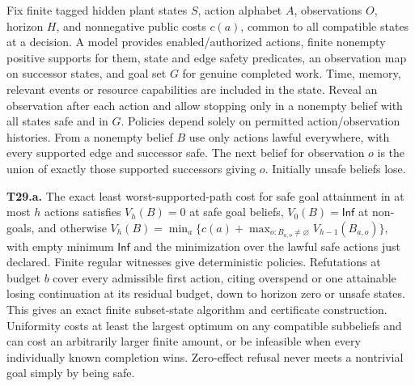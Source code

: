 \begin{theorem}\label{thm:t29}

Fix finite tagged hidden plant states \(S\), action alphabet \(A\), observations \(O\), horizon \(H\), and nonnegative public costs \(c(a)\), common to all compatible states at a decision. A model provides enabled/authorized actions, finite nonempty positive supports for them, state and edge safety predicates, an observation map on successor states, and goal set \(G\) for genuine completed work. Time, memory, relevant events or resource capabilities are included in the state. Reveal an observation after each action and allow stopping only in a nonempty belief with all states safe and in \(G\). Policies depend solely on permitted action/observation histories. From a nonempty belief \(B\) use only actions lawful everywhere, with every supported edge and successor safe. The next belief for observation \(o\) is the union of exactly those supported successors giving \(o\). Initially unsafe beliefs lose.

\label{thm:t29a}

\textbf{T29.a.} The exact least worst-supported-path cost for safe goal attainment in at most \(h\) actions satisfies \(V_h(B)=0\) at safe goal beliefs, \(V_0(B)=\mathsf{Inf}\) at non-goals, and otherwise
\(V_h(B)=\min_a\{c(a)+\max_{o:B_{a,o}\ne\varnothing}V_{h-1}(B_{a,o})\},\)
with empty minimum \(\mathsf{Inf}\) and the minimization over the lawful safe actions just declared. Finite regular witnesses give deterministic policies. Refutations at budget \(b\) cover every admissible first action, citing overspend or one attainable losing continuation at its residual budget, down to horizon zero or unsafe states. This gives an exact finite subset-state algorithm and certificate construction. Uniformity costs at least the largest optimum on any compatible subbeliefs and can cost an arbitrarily larger finite amount, or be infeasible when every individually known completion wins. Zero-effect refusal never meets a nontrivial goal simply by being safe.

\label{thm:t29b}


\end{theorem}
